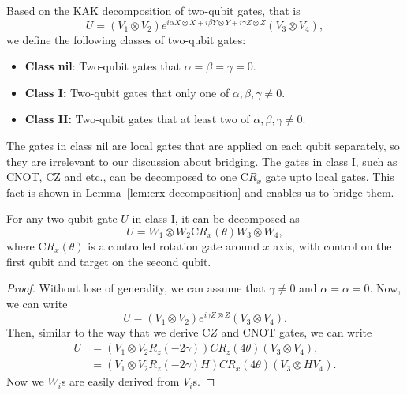 \begin{definition}
  Based on the KAK decomposition of two-qubit gates, that is 
  \begin{equation}
    U = (V_1 \otimes V_2) e^{i \alpha X \otimes X + i \beta Y \otimes Y + i \gamma Z \otimes Z} (V_3 \otimes V_4),
  \end{equation}
  we define the following classes of two-qubit gates:
  \begin{itemize}
    \item \textbf{Class nil}: Two-qubit gates that $\alpha = \beta = \gamma = 0$.
    \item \textbf{Class I:} Two-qubit gates that only one of $\alpha, \beta, \gamma \neq 0$.
    \item \textbf{Class II:} Two-qubit gates that at least two of $\alpha, \beta, \gamma \neq 0$.
  \end{itemize}
\end{definition}

The gates in class nil are local gates that are applied on each qubit separately, so they are irrelevant to our discussion about bridging. The gates in class I, such as CNOT, CZ and etc., can be decomposed to one $\mathrm{C}R_x$ gate upto local gates. This fact is shown in Lemma~\ref{lem:crx-decomposition} and enables us to bridge them.

\begin{lemma}\label{lem:crx-decomposition}
  For any two-qubit gate $U$ in class I, it can be decomposed as 
  \begin{equation}
    U = W_1 \otimes W_2 \mathrm{C}R_x(\theta) W_3 \otimes W_4,
  \end{equation}
  where $\mathrm{C}R_x(\theta)$ is a controlled rotation gate around $x$ axis, with control on the first qubit and target on the second qubit.
\end{lemma}
\begin{proof}
  Without lose of generality, we can assume that $\gamma \neq 0$ and $\alpha = \alpha = 0$. Now, we can write
  \begin{equation}
    U = (V_1 \otimes V_2) e^{i \gamma Z \otimes Z} (V_3 \otimes V_4).
  \end{equation}
  Then, similar to the way that we derive $\mathrm{C}Z$ and $\mathrm{CNOT}$ gates, we can write
  \begin{equation}
    \begin{aligned}
    U &= (V_1 \otimes V_2 R_z(-2\gamma)) CR_z(4\theta) (V_3 \otimes V_4), \\
    &= (V_1 \otimes V_2 R_z(-2\gamma) H) CR_x(4\theta) (V_3 \otimes H V_4).
    \end{aligned}
  \end{equation}
  Now we $W_i$s are easily derived from $V_i$s.
\end{proof}

